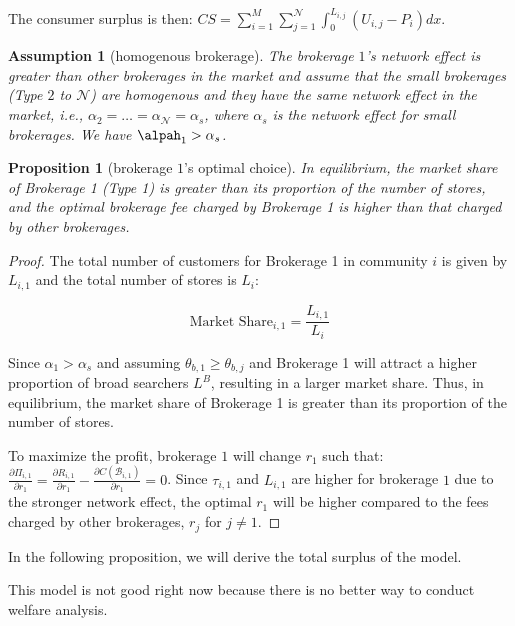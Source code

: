 \documentclass[12pt]{article}
\newtheorem{assumption}{Assumption}
\newtheorem{proposition}{Proposition}
\begin{document}
The consumer surplus is then: $CS = \sum_{i=1}^M \sum_{j=1}^{\mathcal{N}} \int_0^{L_{i, j}} (U_{i, j} - P_i) dx$.

\begin{assumption}[homogenous brokerage]
  The brokerage $1$'s network effect is greater than other brokerages in the market and assume that the small brokerages (Type $2$ to $\mathcal{N}$) are homogenous and they have the same network effect in the market, i.e., $\alpha_2 = \ldots = \alpha_{\mathcal{N}} = \alpha_s$, where $\alpha_s$ is the network effect for small brokerages. We have $\alpah_1 > \alpha_s$.
\end{assumption}

\begin{proposition}[brokerage $1$'s optimal choice]
  In equilibrium, the market share of Brokerage 1 (Type 1) is greater than its proportion of the number of stores, and the optimal brokerage fee charged by Brokerage 1 is higher than that charged by other brokerages. 
\end{proposition}

\begin{proof}
  The total number of customers for Brokerage 1 in community $i$ is given by $L_{i, 1}$ and the total number of stores is $L_{i}$:

  \begin{equation}
    \text{Market Share}_{i, 1} = \frac{L_{i, 1}}{L_i}
  \end{equation}
  
  Since $\alpha_1 > \alpha_s$ and assuming $\theta_{b, 1} \geq \theta_{b, j}$ and Brokerage 1 will attract a higher proportion of broad searchers $L^B$, resulting in a larger market share. Thus, in equilibrium, the market share of Brokerage 1 is greater than its proportion of the number of stores.

  To maximize the profit, brokerage $1$ will change $r_1$ such that: $\frac{\partial \Pi_{i, 1}}{\partial r_1} = \frac{\partial R_{i, 1}}{\partial r_1} - \frac{\partial C(\mathcal{B}_{i, 1})}{\partial r_{1}} = 0$. Since $\tau_{i, 1}$ and $L_{i, 1}$ are higher for brokerage $1$ due to the stronger network effect, the optimal $r_1$ will be higher compared to the fees charged by other brokerages, $r_j$ for $j \neq 1$.
\end{proof}

In the following proposition, we will derive the total surplus of the model.

This model is not good right now because there is no better way to conduct welfare analysis.
\end{document}
